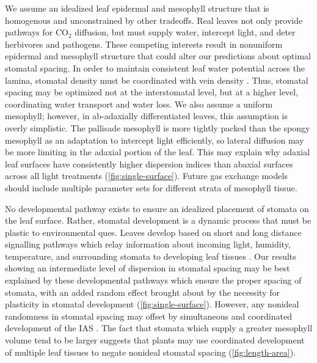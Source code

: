 \documentclass[webpdf,large,modern,unnumsec,namedate]{oup-authoring-template}
\begin{document}
We assume an idealized leaf epidermal and mesophyll structure that is
homogenous and unconstrained by other tradeoffs. Real leaves not only
provide pathways for CO\(_2\) diffusion, but must supply water,
intercept light, and deter herbivores and pathogens. These competing
interests result in nonuniform epidermal and mesophyll structure that
could alter our predictions about optimal stomatal spacing. In order to
maintain consistent leaf water potential across the lamina, stomatal
density must be coordinated with vein density
\citep{fiorin_transport_2016}. Thus, stomatal spacing may be optimized
not at the interstomatal level, but at a higher level, coordinating
water transport and water loss. We also assume a uniform mesophyll;
however, in ab-adaxially differentiated leaves, this assumption is
overly simplistic. The pallisade mesophyll is more tightly packed than
the spongy mesophyll as an adaptation to intercept light efficiently, so
lateral diffusion may be more limiting in the adaxial portion of the
leaf. This may explain why adaxial leaf surfaces have consistently
higher dispersion indices than abaxial surfaces across all light
treatments (\autoref{fig:single-surface}). Future gas exchange models
should include multiple parameter sets for different strata of mesophyll
tissue.

No developmental pathway exists to ensure an idealized placement of
stomata on the leaf surface. Rather, stomatal development is a dynamic
process that must be plastic to environmental ques. Leaves develop based
on short and long distance signalling pathways which relay information
about incoming light, humidity, temperature, and surrounding stomata to
developing leaf tissues \citep{pillitteri_mechanisms_2012}. Our results
showing an intermediate level of dispersion in stomatal spacing may be
best explained by these developmental pathways which ensure the proper
spacing of stomata, with an added random effect brought about by the
necessity for plasticity in stomatal development
(\autoref{fig:single-surface}). However, any nonideal randomness in
stomatal spacing may offset by simultaneous and coordinated development
of the IAS \citep{baillie_developmental_2020}. The fact that stomata
which supply a greater mesophyll volume tend to be larger suggests that
plants may use coordinated development of multiple leaf tissues to
negate nonideal stomatal spacing (\autoref{fig:length-area}).
\end{document}

